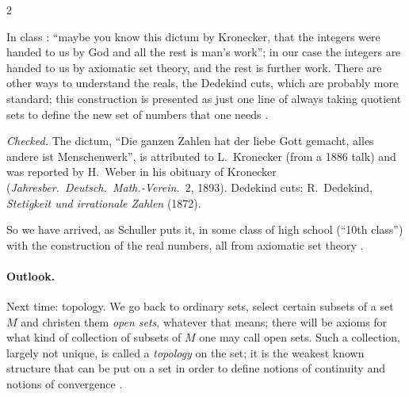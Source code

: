 \begin{paracol}{2}
\begin{history}
In class : ``maybe you know this dictum by Kronecker, that the integers were handed to us by God and all the
rest is man's work''; in our case the integers are handed to us by axiomatic set theory, and the rest is further work. There are
other ways to understand the reals, the Dedekind cuts, which are probably more standard; this construction is presented as
just one line of always taking quotient sets to define the new set of numbers that one needs .\par
\smallskip
\emph{Checked.} The dictum, ``Die ganzen Zahlen hat der liebe Gott gemacht, alles andere ist Menschenwerk'', is attributed to
L.~Kronecker (from a 1886 talk) and was reported by H.~Weber in his obituary of Kronecker (\emph{Jahresber.\ Deutsch.\ Math.-Verein.}\ 2, 1893).
Dedekind cuts: R.~Dedekind, \emph{Stetigkeit und irrationale Zahlen} (1872).
\end{history}

So we have arrived, as Schuller puts it, in some class of high school (``10th class'') with the construction of the real
numbers, all from axiomatic set theory .

\paragraph{Outlook.} Next time: topology. We go back to ordinary sets, select certain subsets of a set $M$ and christen them
\emph{open sets}, whatever that means; there will be axioms for what kind of collection of subsets of $M$ one may call open
sets. Such a collection, largely not unique, is called a \emph{topology} on the set; it is the weakest known structure that
can be put on a set in order to define notions of continuity and notions of convergence .


\end{paracol}
